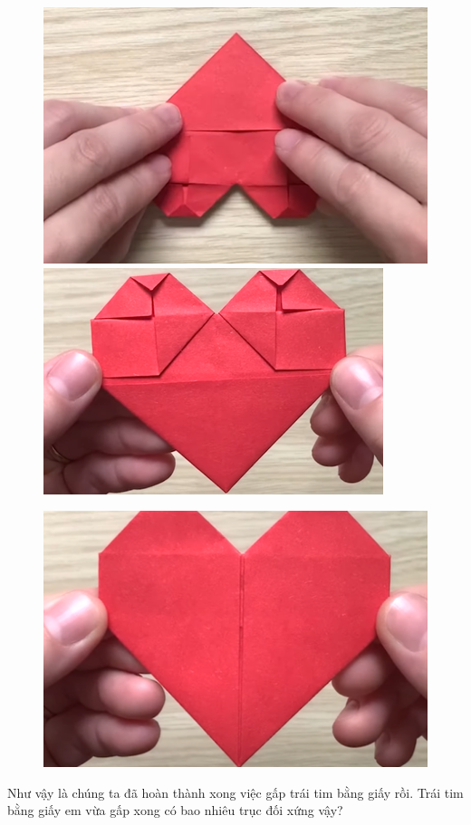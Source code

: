 \begin{multicols}{2}
\begin{figure}[H]
			\vspace*{1pt}
			\includegraphics[height= 0.327\linewidth]{41}
			\includegraphics[height= 0.327\linewidth]{42}
		\end{figure}
		\begin{figure}[H]
			\vspace*{5pt}
			\centering
			\captionsetup{labelformat= empty, justification=centering}
			\includegraphics[width= 1\linewidth]{43}
			\vspace*{-10pt}
		\end{figure}
	Như vậy là chúng ta đã hoàn thành xong việc gấp trái tim bằng giấy rồi. Trái tim bằng giấy em vừa gấp xong có bao nhiêu trục đối xứng vậy?
	\begin{figure}[H]
			\vspace*{-5pt}

\end{figure}
\end{multicols}
